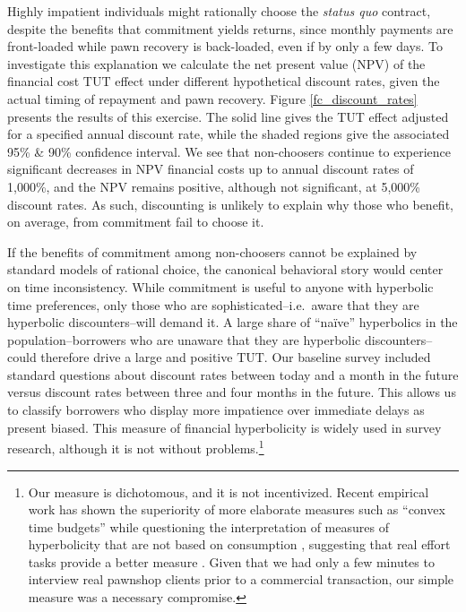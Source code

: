 \documentclass[12pt, a4paper]{article}
\begin{document}

Highly impatient individuals might rationally choose the \emph{status quo} contract, despite the benefits that commitment yields returns, since monthly payments are front-loaded while pawn recovery is back-loaded, even if by only a few days.  
To investigate this explanation we calculate the net present value (NPV) of the financial cost $\text{TUT}$ effect under different hypothetical discount rates, given the actual timing of repayment and pawn recovery. Figure \ref{fc_discount_rates} presents the results of this exercise. 
The solid line gives the TUT effect adjusted for a specified annual discount rate, while the shaded regions give the associated 95\% \& 90\% confidence interval.
We see that non-choosers continue to experience significant decreases in NPV financial costs up to annual discount rates of 1,000\%, and the NPV remains positive, although not significant, at 5,000\% discount rates. As such, discounting is unlikely to explain why those who benefit, on average, from commitment fail to choose it. %


If the benefits of commitment among non-choosers cannot be explained by standard models of rational choice, the canonical behavioral story would center on time inconsistency.  While commitment is useful to anyone with hyperbolic time preferences, only those who are sophisticated--i.e.\ aware that they are hyperbolic discounters--will demand it.  A large share of ``na\"ive'' hyperbolics in the population--borrowers who are unaware that they are hyperbolic discounters--could therefore drive a large and positive $\text{TUT}$.  Our baseline survey included standard questions about discount rates between today and a month in the future versus discount rates between three and four months in the future.
This allows us to classify borrowers who display more impatience over immediate delays as present biased. This measure of financial hyperbolicity is widely used in survey research, although it is not without problems.\footnote{Our measure is dichotomous, and it is not incentivized. Recent empirical work has shown the superiority of more elaborate measures such as ``convex time budgets'' \citep{andreoni2015measuring} while questioning the interpretation of measures of hyperbolicity that are not based on consumption \citep{andreoni2012estimating, cohen2020measuring}, suggesting that real effort tasks provide a better measure \citep{augenblick2015working}.  Given that we had only a few minutes to interview real pawnshop clients prior to a commercial transaction, our simple measure was a necessary compromise.}   
\end{document}
